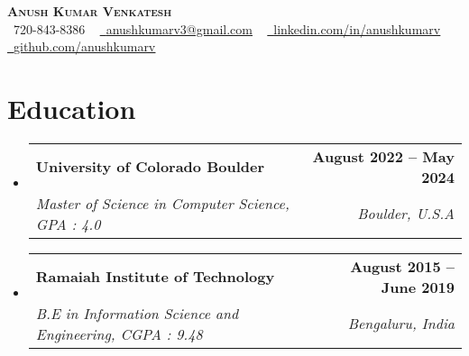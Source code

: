 \documentclass[letterpaper,11pt]{article}
\makeatletter
\newcommand{\resumeSubheading}[4]{
  \vspace{-2pt}\item
    \begin{tabular*}{1.0\textwidth}[t]{l@{\extracolsep{\fill}}r}
      \textbf{#1} & \textbf{\small #2} \\
      \textit{\small#3} & \textit{\small #4} \\
    \end{tabular*}\vspace{-7pt}
}
\newcommand{\resumeSubHeadingListStart}{\begin{itemize}[leftmargin=0.0in, label={}]}
\newcommand{\resumeSubHeadingListEnd}{\end{itemize}}
\makeatother
\begin{document}

\begin{center}
    {\Huge \scshape \textbf{Anush Kumar Venkatesh}} \\ \vspace{1pt}
    \small \raisebox{-0.1\height}\faPhone\ 720-843-8386 ~ \href{mailto:x@gmail.com}{\raisebox{-0.2\height}\faEnvelope\  \underline{anushkumarv3@gmail.com}} ~ 
    \href{https://linkedin.com/in//}{\raisebox{-0.2\height}\faLinkedin\ \underline{linkedin.com/in/anushkumarv}}  ~
    \href{https://github.com/}{\raisebox{-0.2\height}\faGithub\ \underline{github.com/anushkumarv}}
    \vspace{-8pt}
\end{center}

\section{Education}
  \resumeSubHeadingListStart
    \resumeSubheading
      {University of Colorado Boulder}{August 2022 -- May 2024}
      {Master of Science in Computer Science, GPA : 4.0}{Boulder, U.S.A}
    \resumeSubheading
      {Ramaiah Institute of Technology}{August 2015 -- June 2019}
      {B.E in Information Science and Engineering, CGPA : 9.48}{Bengaluru, India}
  \resumeSubHeadingListEnd
\end{document}
